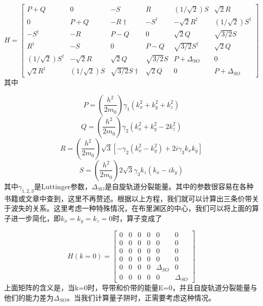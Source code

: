 \documentclass[oneside]{ZJUthesis}
\begin{document}
\begin{equation}
    \label{eq_6times6}
    H = \left[\begin{array}{cccccc}P+Q & 0 & -S & R & (1/\sqrt{2})S & \sqrt{2}R \\0 & P+Q & -R\dag & -S^\dag & -\sqrt{2}R^\dag & (1/\sqrt{2})S^\dag \\-S^\dag & -R & P-Q & 0 & \sqrt{2}Q & \sqrt{3/2}S \\R^\dag & -S & 0 & P-Q & \sqrt{3/2}S^\dag & \sqrt{2}Q \\(1/\sqrt{2})S^\dag & -\sqrt{2}R & \sqrt{2}Q & \sqrt{3/2}S & P+\Delta_{SO} & 0 \\\sqrt{2}R^\dag & (1/\sqrt{2})S & \sqrt{3/2}S\dag & \sqrt{2}Q & 0 & P+\Delta_{SO}\end{array}\right]
\end{equation}
其中

\begin{equation}
    P = \left( \frac{h^2}{2m_0} \right) \gamma_1 (k^2_x + k^2_y + k^2_z)
\end{equation}
\begin{equation}
    Q = \left( \frac{h^2}{2m_0} \right) \gamma_2 (k^2_x + k^2_y - 2k^2_z)
\end{equation}
\begin{equation}
    R = \left( \frac{h^2}{2m_0} \right) \sqrt{3} [-\gamma_2 (k^2_x - k^2_y) + 2i \gamma_3 k_x k_y]
\end{equation}
\begin{equation}
    S = \left( \frac{h^2}{2m_0} \right) 2 \sqrt{3} \gamma_3 k_z (k_x - ik_y)
\end{equation}
其中$\gamma_{1,2,3}$是Luttinger参数，$\Delta_{SO}$是自旋轨道分裂能量。其中的参数很容易在各种书籍或文章中查到，这里不再赘述。根据以上方程，我们就可以计算出三条价带关于波失的关系。这里考虑一种特殊情况，在布里渊区的中心，我们可以将上面的算子进一步简化，即$k_x=k_y=k_z=0$时，算子变成了

\begin{equation}
    H(k=0) = \left[\begin{array}{cccccc}0 & 0 & 0 & 0 & 0 & 0 \\0 & 0 & 0 & 0 & 0 & 0 \\0 & 0 & 0 & 0 & 0 & 0 \\0 & 0 & 0 & 0 & 0 & 0 \\0 & 0 & 0 & 0 & \Delta_{SO} & 0 \\0 & 0 & 0 & 0 & 0 & \Delta_{SO}\end{array}\right]
\end{equation}
上面矩阵的含义是，当k=0时，导带和价带的能量E=0，并且自旋轨道分裂能量与他们的能力差为$\Delta_{SO}$。当我们计算量子阱时，正需要考虑这种情况。
\end{document}
